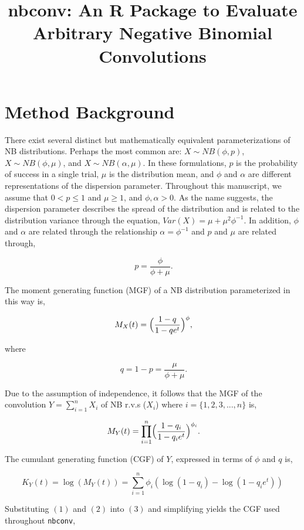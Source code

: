 \documentclass{article}
\title{nbconv: An R Package to Evaluate Arbitrary Negative Binomial Convolutions}
\begin{document}
	
\section{Method Background}

There exist several distinct but mathematically equivalent parameterizations of NB distributions. Perhaps the most common are: $ X \sim NB(\phi, p) $, $ X \sim NB(\phi, \mu) $, and $ X \sim NB(\alpha, \mu) $. In these formulations, $p$ is the probability of success in a single trial, $\mu$ is the distribution mean, and $\phi$ and $\alpha$ are different representations of the dispersion parameter. Throughout this manuscript, we assume that $0 < p \le 1$ and $\mu \ge 1$, and $ \phi, \alpha > 0$. As the name suggests, the dispersion parameter describes the spread of the distribution and is related to the distribution variance through the equation, $ Var(X) = \mu + \mu^2\phi^{-1}$. In addition, $\phi$ and $\alpha$ are related through the relationship $ \alpha = \phi^{-1} $ and $p$ and $\mu$ are related through, 

\begin{equation}
	\phantom{.} p = \frac{\phi}{\phi + \mu}.
\end{equation}

The moment generating function (MGF) of a NB distribution parameterized in this way is,

$$
\phantom{,} M_X(t) = \Bigl( \frac{ 1-q }{ 1-qe^t} \Bigr)^{ \phi }, 
$$

where 

\begin{equation}
	\phantom{.} q=1-p = \frac{ \mu }{ \phi + \mu }.
\end{equation}

Due to the assumption of independence, it follows that the MGF of the convolution $Y = \sum_{i=1}^n X_i$ of NB r.v.s ($X_i$) where $i=\{1,2,3,...,n\}$ is,

$$ 
\phantom{.} M_{Y}(t) = \prod_{i=1}^n \Bigl( \frac{ 1-q_i }{ 1-q_ie^t} \Bigr)^{\phi_i}. 
$$

The cumulant generating function (CGF) of $Y$, expressed in terms of $\phi$ and $q$ is,

\begin{equation} 
	K_Y(t) = \log ( M_Y(t)) = \sum_{i=1}^n \phi_i ( \log(1-q_i)-\log(1-q_ie^{t}) )
\end{equation}

Substituting $(1)$ and $(2)$ into $(3)$ and simplifying yields the CGF used throughout \verb|nbconv|,
\end{document}
